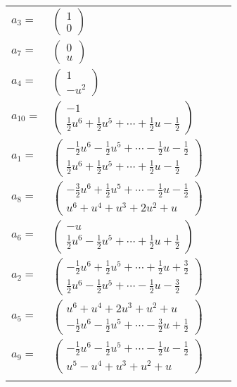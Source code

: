 \documentclass[1p]{elsarticle_modified}
\theoremstyle{definition}
\begin{document}
\begin{tabular}{m{7pt} m{180pt} m{7pt} m{180pt} }
\flushright $a_{3}=$&$\begin{pmatrix}1\\0\end{pmatrix}$ \\
\flushright $a_{7}=$&$\begin{pmatrix}0\\u\end{pmatrix}$ \\
\flushright $a_{4}=$&$\begin{pmatrix}1\\- u^2\end{pmatrix}$ \\
\flushright $a_{10}=$&$\begin{pmatrix}-1\\\frac{1}{2} u^6+\frac{1}{2} u^5+\cdots+\frac{1}{2} u-\frac{1}{2}\end{pmatrix}$ \\
\flushright $a_{1}=$&$\begin{pmatrix}-\frac{1}{2} u^6-\frac{1}{2} u^5+\cdots-\frac{1}{2} u-\frac{1}{2}\\\frac{1}{2} u^6+\frac{1}{2} u^5+\cdots+\frac{1}{2} u-\frac{1}{2}\end{pmatrix}$ \\
\flushright $a_{8}=$&$\begin{pmatrix}-\frac{3}{2} u^6+\frac{1}{2} u^5+\cdots-\frac{1}{2} u-\frac{1}{2}\\u^6+u^4+u^3+2 u^2+u\end{pmatrix}$ \\
\flushright $a_{6}=$&$\begin{pmatrix}- u\\\frac{1}{2} u^6-\frac{1}{2} u^5+\cdots+\frac{1}{2} u+\frac{1}{2}\end{pmatrix}$ \\
\flushright $a_{2}=$&$\begin{pmatrix}-\frac{1}{2} u^6+\frac{1}{2} u^5+\cdots+\frac{1}{2} u+\frac{3}{2}\\\frac{1}{2} u^6-\frac{1}{2} u^5+\cdots-\frac{1}{2} u-\frac{3}{2}\end{pmatrix}$ \\
\flushright $a_{5}=$&$\begin{pmatrix}u^6+u^4+2 u^3+u^2+u\\-\frac{1}{2} u^6-\frac{1}{2} u^5+\cdots-\frac{3}{2} u+\frac{1}{2}\end{pmatrix}$ \\
\flushright $a_{9}=$&$\begin{pmatrix}-\frac{1}{2} u^6-\frac{1}{2} u^5+\cdots-\frac{1}{2} u-\frac{1}{2}\\u^5- u^4+u^3+u^2+u\end{pmatrix}$\\&\end{tabular}
\end{document}
